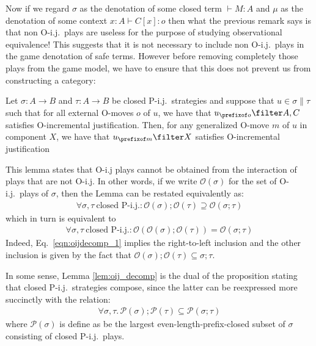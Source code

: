 Now if we regard $\sigma$ as the denotation of some closed term $\vdash M:A$ and $\mu$ as the
denotation of some context $x:A \vdash C[x]:o$ then what the previous remark says is that
non O-i.j.\ plays are useless for the purpose of studying observational equivalence!
This suggests that it is not necessary to include non O-i.j.\ plays in the game denotation of safe terms. However before removing completely those plays from the game model, we have to ensure that this does not prevent us from constructing a category:
\begin{lemma}
\label{lem:oij_decomp}
Let $\sigma : A\rightarrow B$ and $\tau : A\rightarrow B$ be closed P-i.j.\ strategies and suppose
that $u\in \sigma \| \tau$ such that for all external O-moves $o$ of $u$, we have that $u_{\prefixof o} \filter A,C$ satisfies
O-incremental justification. Then, for any generalized O-move $m$ of $u$ in component $X$, we have that
$u_{\prefixof m} \filter X$ satisfies O-incremental justification
\end{lemma}

This lemma states that O-i.j plays cannot be obtained from the interaction of plays that are not O-i.j. In other words, if we write $\mathcal{O}(\sigma)$ for the set of O-i.j.\ plays of $\sigma$, then the Lemma can be restated equivalently as:
\begin{eqnarray}
     \forall \sigma, \tau\ \mbox{closed P-i.j.}: \mathcal{O}(\sigma) ; \mathcal{O}(\tau) \supseteq \mathcal{O}(\sigma ; \tau)
     \label{eqn:oijdecomp_1}
\end{eqnarray}
which in turn is equivalent to
\begin{eqnarray}
    \forall \sigma, \tau\ \mbox{closed P-i.j.}: \mathcal{O}( \mathcal{O}(\sigma) ; \mathcal{O}(\tau) ) = \mathcal{O}(\sigma ; \tau)
    \label{eqn:oijdecomp_2}
\end{eqnarray}
Indeed, Eq.~\ref{eqn:oijdecomp_1} implies the right-to-left inclusion and the other inclusion
is given by the fact that $\mathcal{O}(\sigma) ; \mathcal{O}(\tau) \subseteq \sigma;\tau$.


In some sense, Lemma \ref{lem:oij_decomp} is the dual of the proposition stating that closed P-i.j.\
strategies compose, since  the latter can be reexpressed more succinctly with the relation:
\begin{eqnarray}
     \forall \sigma, \tau .\, \mathcal{P}(\sigma) ; \mathcal{P}(\tau) \subseteq \mathcal{P}(\sigma ; \tau)
     \label{eqn:pijcomp_1}
\end{eqnarray}
where $\mathcal{P}(\sigma)$ is define as be the largest even-length-prefix-closed subset of $\sigma$ consisting of closed P-i.j.\ plays.

